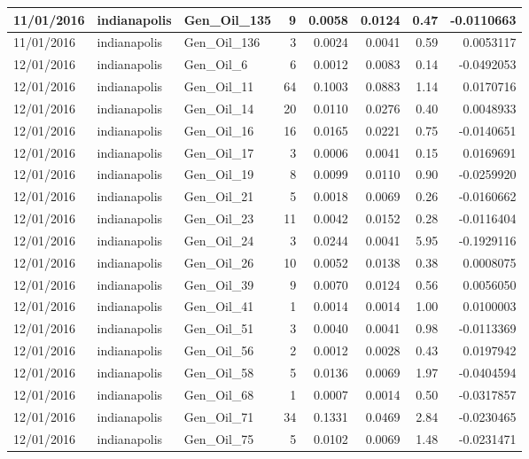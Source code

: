 \documentclass[
  letterpaper,
  DIV=11,
  numbers=noendperiod]{scrartcl}
\begin{document}
\begin{tabular}{l|l|l|r|r|r|r|r}
\hline
11/01/2016 & indianapolis & Gen\_Oil\_135 & 9 & 0.0058 & 0.0124 & 0.47 & -0.0110663\\
\hline
11/01/2016 & indianapolis & Gen\_Oil\_136 & 3 & 0.0024 & 0.0041 & 0.59 & 0.0053117\\
\hline
12/01/2016 & indianapolis & Gen\_Oil\_6 & 6 & 0.0012 & 0.0083 & 0.14 & -0.0492053\\
\hline
12/01/2016 & indianapolis & Gen\_Oil\_11 & 64 & 0.1003 & 0.0883 & 1.14 & 0.0170716\\
\hline
12/01/2016 & indianapolis & Gen\_Oil\_14 & 20 & 0.0110 & 0.0276 & 0.40 & 0.0048933\\
\hline
12/01/2016 & indianapolis & Gen\_Oil\_16 & 16 & 0.0165 & 0.0221 & 0.75 & -0.0140651\\
\hline
12/01/2016 & indianapolis & Gen\_Oil\_17 & 3 & 0.0006 & 0.0041 & 0.15 & 0.0169691\\
\hline
12/01/2016 & indianapolis & Gen\_Oil\_19 & 8 & 0.0099 & 0.0110 & 0.90 & -0.0259920\\
\hline
12/01/2016 & indianapolis & Gen\_Oil\_21 & 5 & 0.0018 & 0.0069 & 0.26 & -0.0160662\\
\hline
12/01/2016 & indianapolis & Gen\_Oil\_23 & 11 & 0.0042 & 0.0152 & 0.28 & -0.0116404\\
\hline
12/01/2016 & indianapolis & Gen\_Oil\_24 & 3 & 0.0244 & 0.0041 & 5.95 & -0.1929116\\
\hline
12/01/2016 & indianapolis & Gen\_Oil\_26 & 10 & 0.0052 & 0.0138 & 0.38 & 0.0008075\\
\hline
12/01/2016 & indianapolis & Gen\_Oil\_39 & 9 & 0.0070 & 0.0124 & 0.56 & 0.0056050\\
\hline
12/01/2016 & indianapolis & Gen\_Oil\_41 & 1 & 0.0014 & 0.0014 & 1.00 & 0.0100003\\
\hline
12/01/2016 & indianapolis & Gen\_Oil\_51 & 3 & 0.0040 & 0.0041 & 0.98 & -0.0113369\\
\hline
12/01/2016 & indianapolis & Gen\_Oil\_56 & 2 & 0.0012 & 0.0028 & 0.43 & 0.0197942\\
\hline
12/01/2016 & indianapolis & Gen\_Oil\_58 & 5 & 0.0136 & 0.0069 & 1.97 & -0.0404594\\
\hline
12/01/2016 & indianapolis & Gen\_Oil\_68 & 1 & 0.0007 & 0.0014 & 0.50 & -0.0317857\\
\hline
12/01/2016 & indianapolis & Gen\_Oil\_71 & 34 & 0.1331 & 0.0469 & 2.84 & -0.0230465\\
\hline
12/01/2016 & indianapolis & Gen\_Oil\_75 & 5 & 0.0102 & 0.0069 & 1.48 & -0.0231471\\

\end{tabular}
\end{document}
